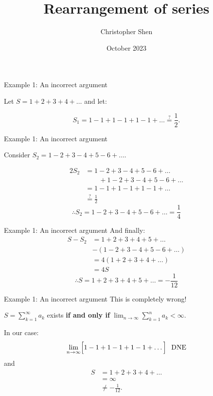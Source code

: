 \documentclass{beamer}
\title{Rearrangement of series}
\author{Christopher Shen}
\date{October 2023}
\begin{document}
\maketitle

\begin{frame}{Example 1: An incorrect argument}
    \begin{center}
        Let $S=1+2+3+4+\dots$ and let:

        $$S_1=1-1+1-1+1-1+\dots\stackrel{?}{=}\frac{1}{2}.$$
    \end{center}
\end{frame}

\begin{frame}{Example 1: An incorrect argument}
    \begin{center}
        Consider $S_2=1-2+3-4+5-6+\dots$.
    \end{center}
    \begin{align*}
        2S_2
        &=1-2+3-4+5-6+\dots \\
        &\quad\quad+1-2+3-4+5-6+\dots \\
        &=1-1+1-1+1-1+\dots \\
        &\stackrel{?}{=}\frac{1}{2}
    \end{align*}
    $$\therefore S_2=1-2+3-4+5-6+\dots=\frac{1}{4}$$
\end{frame}

\begin{frame}{Example 1: An incorrect argument}
    And finally:
    \begin{align*}
        S-S_2
        &=1+2+3+4+5+\dots \\
        &-(1-2+3-4+5-6+\dots) \\
        &=4(1+2+3+4+\dots) \\
        &=4S
    \end{align*}
    $$\therefore S=1+2+3+4+5+\dots=-\frac{1}{12}$$
\end{frame}

\begin{frame}{Example 1: An incorrect argument}
    This is completely wrong!
    \begin{center}
        $S=\displaystyle\sum_{k=1}^{\infty}a_k$ exists
        \textbf{if and only if}
        $\displaystyle\lim_{n\rightarrow\infty}
        \sum_{k=1}^{n}a_k<\infty$.
    \end{center}  
    In our case:
    $$\displaystyle\lim_{n\rightarrow\infty}
    \Bigl[1-1+1-1+1-1+\dots\Bigr]\hspace{0.1in}\text{DNE}$$
    and
    \begin{align*}
        S
        &=1+2+3+4+\dots \\
        &=\infty \\
        &\neq -\frac{1}{12}.
    \end{align*}
\end{frame}
\end{document}
